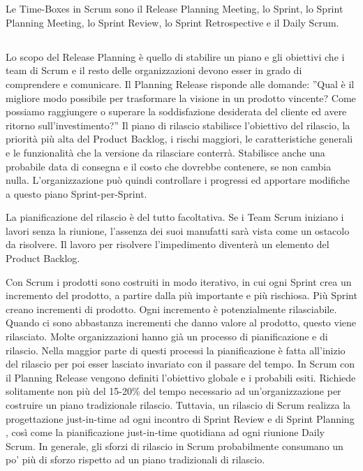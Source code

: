 \section*{\color{Blue}{TIME-BOXES}}
\label{sec:timeboxes}
Le Time-Boxes in Scrum sono il Release Planning Meeting, lo Sprint, lo Sprint Planning Meeting, lo Sprint Review, lo Sprint Retrospective
e il Daily Scrum.

\subsection*{\color{Blue}{RELEASE PLANNING MEETING}}
\label{sec:releaseplanningmeeting}
Lo scopo del Release Planning \`e quello di stabilire un piano e gli obiettivi che i team di Scrum e il resto delle organizzazioni devono
esser in grado di comprendere e comunicare. Il Planning Release risponde alle domande: ''Qual \`e il migliore modo possibile per
trasformare la visione in un prodotto vincente? Come possiamo raggiungere o superare la soddisfazione desiderata del cliente ed avere
ritorno sull'investimento?'' Il piano di rilascio stabilisce l'obiettivo del rilascio, la priorit\`a pi\`u alta del Product Backlog, i
rischi maggiori, le caratteristiche generali e le funzionalit\`a che la versione da rilasciare conterr\`a. Stabilisce anche una probabile
data di consegna e il costo che dovrebbe contenere, se non cambia nulla. L'organizzazione pu\`o quindi controllare i progressi ed
apportare modifiche a questo piano Sprint-per-Sprint.
\newline

La pianificazione del rilascio \`e del tutto facoltativa. Se i Team Scrum iniziano i lavori senza la riunione, l'assenza dei suoi
manufatti sar\`a vista come un ostacolo da risolvere. Il lavoro per risolvere l'impedimento diventer\`a un elemento del Product Backlog.
\newline

Con Scrum i prodotti sono costruiti in modo iterativo, in cui ogni Sprint crea un incremento del prodotto, a partire dalla pi\`u
importante e pi\`u rischiosa. Pi\`u Sprint creano incrementi di prodotto. Ogni incremento \`e potenzialmente rilasciabile. Quando ci sono
abbastanza incrementi che danno valore al prodotto, questo viene rilasciato. Molte organizzazioni hanno gi\`a un processo di
pianificazione e di rilascio. Nella maggior parte di questi processi la pianificazione \`e fatta all'inizio del rilascio per poi esser
lasciato invariato con il passare del tempo. In Scrum con il Planning Release vengono definiti l'obiettivo globale e i probabili esiti.
Richiede solitamente non pi\`u del 15-20\% del tempo necessario ad un'organizzazione per costruire un piano tradizionale rilascio.
Tuttavia, un rilascio di Scrum realizza la progettazione just-in-time ad ogni incontro di Sprint Review e di Sprint Planning , cos\`i
come la pianificazione just-in-time quotidiana ad ogni riunione Daily Scrum. In generale, gli sforzi di rilascio in Scrum probabilmente
consumano un po' pi\`u di sforzo rispetto ad un piano tradizionali di rilascio.
\newline

